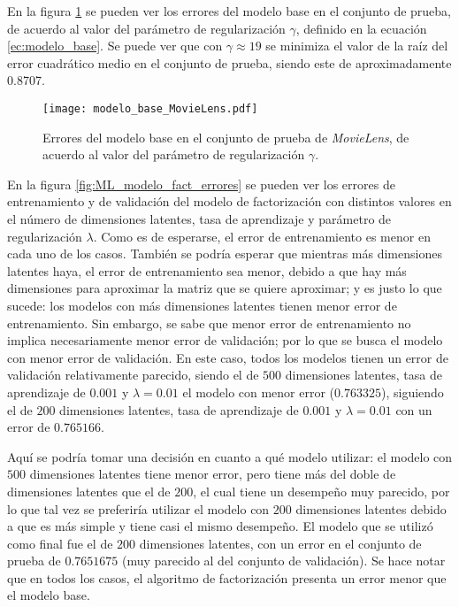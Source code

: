 En la figura \ref{fig:ML_modelo_base_errores} se pueden ver los errores del modelo base en el conjunto de prueba, de acuerdo al valor del parámetro de regularización $\gamma$, definido en la ecuación \ref{ec:modelo_base}. Se puede ver que con $\gamma \approx 19$ se minimiza el valor de la raíz del error cuadrático medio en el conjunto de prueba, siendo este de aproximadamente 0.8707.

\begin{figure}[H]
	\centering
 	\texttt{[image: modelo\_base\_MovieLens.pdf]}
 	\caption{Errores del modelo base en el conjunto de prueba de \textit{MovieLens}, de acuerdo al valor del parámetro de regularización $\gamma$.}
 	\label{fig:ML_modelo_base_errores}
\end{figure}

En la figura \ref{fig:ML_modelo_fact_errores} se pueden ver los errores de entrenamiento y de validación del modelo de factorización con distintos valores en el número de dimensiones latentes, tasa de aprendizaje y parámetro de regularización $\lambda$. Como es de esperarse, el error de entrenamiento es menor en cada uno de los casos. También se podría esperar que mientras más dimensiones latentes haya, el error de entrenamiento sea menor, debido a que hay más dimensiones para aproximar la matriz que se quiere aproximar; y es justo lo que sucede: los modelos con más dimensiones latentes tienen menor error de entrenamiento. Sin embargo, se sabe que menor error de entrenamiento no implica necesariamente menor error de validación; por lo que se busca el modelo con menor error de validación. En este caso, todos los modelos tienen un error de validación relativamente parecido, siendo el de $500$ dimensiones latentes, tasa de aprendizaje de $0.001$ y $\lambda = 0.01$ el modelo con menor error ($0.763325$), siguiendo el de $200$ dimensiones latentes, tasa de aprendizaje de $0.001$ y $\lambda = 0.01$ con un error de $0.765166$. 

Aquí se podría tomar una decisión en cuanto a qué modelo utilizar: el modelo con $500$ dimensiones latentes tiene menor error, pero tiene más del doble de dimensiones latentes que el de $200$, el cual tiene un desempeño muy parecido, por lo que tal vez se preferiría utilizar el modelo con $200$ dimensiones latentes debido a que es más simple y tiene casi el mismo desempeño. El modelo que se utilizó como final fue el de $200$ dimensiones latentes, con un error en el conjunto de prueba de $0.7651675$ (muy parecido al del conjunto de validación). Se hace notar que en todos los casos, el algoritmo de factorización presenta un error menor que el modelo base.

